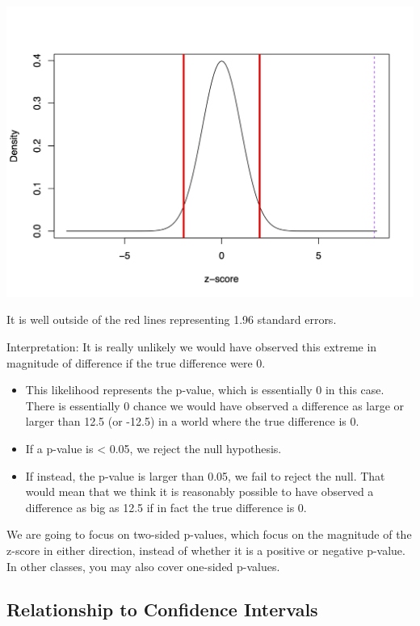 \documentclass[
  letterpaper,
  DIV=11,
  numbers=noendperiod]{scrreprt}
\providecommand{\tightlist}{%
  \setlength{\itemsep}{0pt}\setlength{\parskip}{0pt}}\usepackage{longtable,booktabs,array}
\begin{document}
\includegraphics{images/zscore2.png}

It is well outside of the red lines representing 1.96 standard errors.

Interpretation: It is really unlikely we would have observed this
extreme in magnitude of difference if the true difference were 0.

\begin{itemize}
\tightlist
\item
  This likelihood represents the p-value, which is essentially 0 in this
  case. There is essentially 0 chance we would have observed a
  difference as large or larger than 12.5 (or -12.5) in a world where
  the true difference is 0.
\item
  If a p-value is \textless{} 0.05, we reject the null hypothesis.
\item
  If instead, the p-value is larger than 0.05, we fail to reject the
  null. That would mean that we think it is reasonably possible to have
  observed a difference as big as 12.5 if in fact the true difference is
  0.
\end{itemize}

We are going to focus on two-sided p-values, which focus on the
magnitude of the z-score in either direction, instead of whether it is a
positive or negative p-value. In other classes, you may also cover
one-sided p-values.

\hypertarget{relationship-to-confidence-intervals}{%
\subsection{Relationship to Confidence
Intervals}\label{relationship-to-confidence-intervals}}
\end{document}

